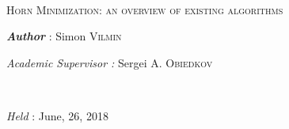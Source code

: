 \begin{titlepage}
\begin{center}
        
        \TLine \\
        \vspace{1.2em}
        \textsc{\LARGE{Horn Minimization: an overview of existing algorithms}}
        \TLine \\
        
        \vspace{5mm}
        \noindent
        
        
        \begin{minipage}{0.4\textwidth}
            \begin{flushleft}
                \hspace{-20mm}
                \vspace{10mm}
                \textit{\textbf{Author}} : Simon \textsc{Vilmin}\\  
                
                \vspace{4mm}
                
                \hspace{-20mm}
                \emph{Academic Supervisor :} Sergei A. \textsc{Obiedkov} \\
                \vspace{1.2em}
                \hspace{-20mm}
                    
            \end{flushleft}
        \end{minipage}
        ~
        \begin{minipage}{0.4\textwidth}
            \begin{flushright}
                \vspace{19mm}
                \emph{Held} : June, 26, 2018 \\
                \vspace{1.2em}
            \end{flushright}
        \end{minipage}
        
        \vspace{15mm}
        

\end{center}
\end{titlepage}
